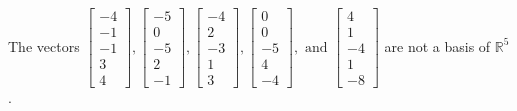 \begin{exercise}
\begin{exerciseStatement}
  \end{exerciseStatement}
  \begin{exerciseAnswer}
   The vectors \(\left[\begin{array}{r}
-4 \\
-1 \\
-1 \\
3 \\
4
\end{array}\right] , \left[\begin{array}{r}
-5 \\
0 \\
-5 \\
2 \\
-1
\end{array}\right] , \left[\begin{array}{r}
-4 \\
2 \\
-3 \\
1 \\
3
\end{array}\right] , \left[\begin{array}{r}
0 \\
0 \\
-5 \\
4 \\
-4
\end{array}\right] , \text{ and } \left[\begin{array}{r}
4 \\
1 \\
-4 \\
1 \\
-8
\end{array}\right]\) 
  	 are not  a basis of \(\mathbb{R}^5\).
  


  \end{exerciseAnswer}
\end{exercise}